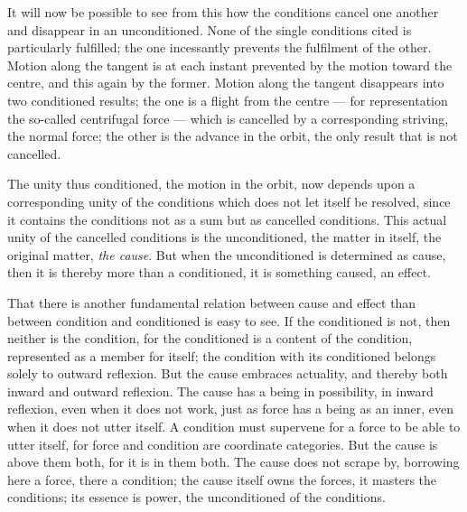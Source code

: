 \documentclass[12pt,a4paper]{book}
\begin{document}
It will now be possible to see from this how the conditions cancel one another and disappear in
an unconditioned. None of the single conditions cited is particularly fulfilled; the one
incessantly prevents the fulfilment of the other. Motion along the tangent is at each instant
prevented by the motion toward the centre, and this again by the former. Motion along the
tangent disappears into two conditioned results; the one is a flight from the centre --- for
representation the so-called centrifugal force --- which is cancelled by a corresponding
striving, the normal force; the other is the advance in the orbit, the only result that is not
cancelled.

The unity thus conditioned, the motion in the orbit, now depends upon a corresponding unity of
the conditions which does not let itself be resolved, since it contains the conditions not as a
sum but as cancelled conditions. This actual unity of the cancelled conditions is the
unconditioned, the matter in itself, the original matter, \emph{the cause}.
But when the unconditioned is determined as cause, then it is thereby
more than a conditioned, it is something caused, an effect.

That there is another fundamental relation between cause and effect than between condition
and conditioned is easy to see. If the conditioned is not, then neither is the condition,
for the conditioned is a content of the condition, represented as a member for itself; the
condition with its conditioned belongs solely to outward reflexion. But the cause embraces
actuality, and thereby both inward and outward reflexion. The cause has a being in
possibility, in inward reflexion, even when it does not work, just as force has a being as
an inner, even when it does not utter itself. A condition must supervene for a force to be
able to utter itself, for force and condition are coordinate categories. But the cause is
above them both, for it is in them both. The cause does not scrape by, borrowing here a
force, there a condition; the cause itself owns the forces, it masters the conditions; its
essence is power, the unconditioned of the conditions.
\end{document}
